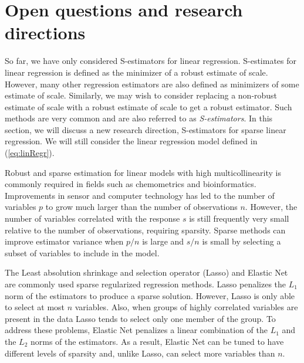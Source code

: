 

\section{Open questions and research directions}

So far, we have only considered S-estimators for linear regression. S-estimates for linear regression is defined as the minimizer of a robust estimate of scale. However, many other regression estimators are also defined as minimizers of some estimate of scale. Similarly, we may wish to consider replacing a non-robust estimate of scale with a robust estimate of scale to get a robust estimator. Such methods are very common and are also referred to as \textit{S-estimators}. In this section, we will discuss a new research direction, S-estimators for sparse linear regression. We will still consider the linear regression model defined in (\ref{eq:linRegr}).

Robust and sparse estimation for linear models with high multicollinearity is commonly required in fields such as chemometrics and bioinformatics. Improvements in sensor and computer technology has led to the number of variables $p$ to grow much larger than the number of observations $n$. However, the number of variables correlated with the response $s$ is still frequently very small relative to the number of observations, requiring sparsity. Sparse methods can improve estimator variance when $p/n$ is large and $s/n$ is small by selecting a subset of variables to include in the model.

The Least absolution shrinkage and selection operator (Lasso) \cite{tibsLasso} and Elastic Net \cite{hastie2005} are commonly used sparse regularized regression methods. Lasso penalizes the $L_1$ norm of the estimators to produce a sparse solution. However, Lasso is only able to select at most $n$ variables. Also, when groups of highly correlated variables are present in the data Lasso tends to select only one member of the group. To address these problems, Elastic Net penalizes a linear combination of the $L_1$ and the $L_2$ norms of the estimators. As a result, Elastic Net can be tuned to have different levels of sparsity and, unlike Lasso, can select more variables than $n$.


